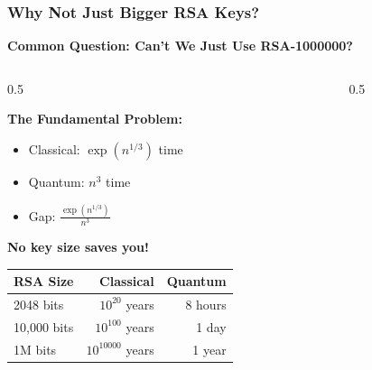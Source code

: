 \documentclass[aspectratio=169,10pt]{beamer}
\newcommand{\slideheader}[1]{\frametitle{#1}}
\theoremstyle{plain}
\begin{document}
\begin{frame}
  \slideheader{Why Not Just Bigger RSA Keys?}
  
  \begin{center}
    \textbf{\large Common Question: Can't We Just Use RSA-1000000?}
  \end{center}
  
  \vspace{0.5cm}
  
  \begin{columns}[T]
    \begin{column}{0.5\textwidth}

    \textbf{The Fundamental Problem:}
    
    \begin{itemize}
      \item Classical: $\exp(n^{1/3})$ time
      \item Quantum: $n^3$ time
      \item Gap: $\frac{\exp(n^{1/3})}{n^3}$
    \end{itemize}
    
    \vspace{0.3cm}
    
    \textbf{No key size saves you!}
    
    \begin{tabular}{|l|r|r|}
      \hline
      \textbf{RSA Size} & \textbf{Classical} & \textbf{Quantum} \\
      \hline
      2048 bits & $10^{20}$ years & 8 hours \\
      10,000 bits & $10^{100}$ years & 1 day \\
      1M bits & $10^{10000}$ years & 1 year \\
      \hline
    \end{tabular}
  
    \end{column}
    \begin{column}{0.5\textwidth}

\end{column}
\end{columns}
\end{frame}
\end{document}
